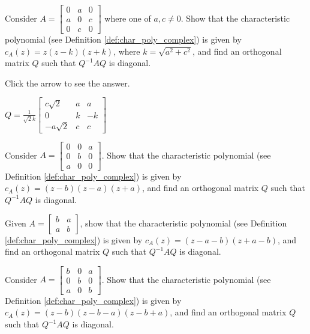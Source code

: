 \documentclass{ximera}
\begin{document}
\begin{problem}\label{prob:ortho11}
Consider $A = \begin{bmatrix}
0 & a & 0 \\
a & 0 & c \\
0 & c & 0
\end{bmatrix}$
 where one of $a, c \neq 0$. Show that the characteristic polynomial (see Definition \ref{def:char_poly_complex}) is given by $c_{A}(z) = z(z - k)(z + k)$, where $k = \sqrt{a^2 + c^2}$, and find an orthogonal matrix $Q$ such that $Q^{-1}AQ$ is diagonal.

Click the arrow to see the answer.
\begin{expandable}
$Q = \frac{1}{\sqrt{2}k}\begin{bmatrix}
c\sqrt{2} & a & a \\
0 & k & -k \\
-a\sqrt{2} & c & c
\end{bmatrix}$
\end{expandable}
\end{problem}

\begin{problem}\label{prob:ortho12}
Consider $A = \begin{bmatrix}
0 & 0 & a \\
0 & b & 0 \\
a & 0 & 0
\end{bmatrix}$. Show that the characteristic polynomial (see Definition \ref{def:char_poly_complex}) is given by $c_{A}(z) = (z - b)(z - a)(z + a)$, and find an orthogonal matrix $Q$ such that $Q^{-1}AQ$ is diagonal.
\end{problem}

\begin{problem}\label{prob:ortho13}
Given $A = \begin{bmatrix}
b & a \\
a & b
\end{bmatrix}$, show that the characteristic polynomial (see Definition \ref{def:char_poly_complex}) is given by $c_{A}(z) = (z - a - b)(z + a - b)$, and find an orthogonal matrix $Q$ such that $Q^{-1}AQ$ is diagonal.
\end{problem}

\begin{problem}\label{prob:ortho14}
Consider $A = \begin{bmatrix}
b & 0 & a \\
0 & b & 0 \\
a & 0 & b
\end{bmatrix}$. Show that the characteristic polynomial (see Definition \ref{def:char_poly_complex}) is given by $c_{A}(z) = (z - b)(z - b - a)(z - b + a)$, and find an orthogonal matrix $Q$ such that $Q^{-1}AQ$ is diagonal.
\end{problem}
\end{document}
